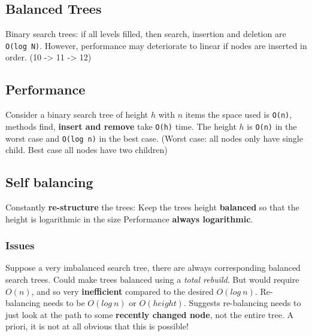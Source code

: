 \documentclass{article}
\begin{document}
	\subsection{Balanced Trees}
	\begin{flushleft}
		Binary search trees: if all levels filled, then search, insertion and deletion are \texttt{O(log N)}. However, performance may deteriorate to linear if nodes are inserted in order. (10 -> 11 -> 12)
	\end{flushleft}	
	
	\subsection{Performance}
	\begin{flushleft}
		Consider a binary search tree of height $h$ with $n$ items the space used is \texttt{O(n)}, methods find, \textbf{insert and remove} take \texttt{O(h)} time. The height $h$ is \texttt{O(n)} in the worst case and \texttt{O(log n)} in the best case. (Worst case: all nodes only have single child. Best case all nodes have two children)
	\end{flushleft}	

	\subsection{Self balancing}	
	\begin{flushleft}
		Constantly \textbf{re-structure} the trees: Keep the trees height \textbf{balanced} so that the height is logarithmic in the size Performance \textbf{always logarithmic}.
	\end{flushleft}	
	
	\subsubsection{Issues}
	\begin{flushleft}
		Suppose a very imbalanced search tree, there are always corresponding balanced search trees. Could make trees balanced using a \textit{total rebuild}. But would require $O(n)$, and so very \textbf{inefficient} compared to the desired $O(log \: n)$. Re-balancing needs to be $O(log \: n)$ or $O(height)$. Suggests re-balancing needs to just look at the path to some \textbf{recently changed node}, not the entire tree. A priori, it is not at all obvious that this is possible!
	\end{flushleft}
\end{document}
